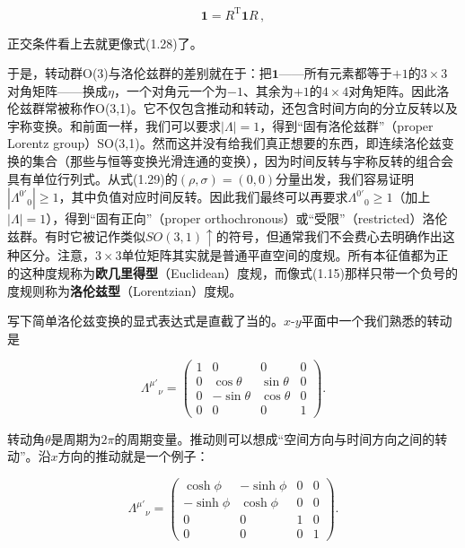 \begin{equation*}
\mathbf{1}=R^{\mathrm{T}}\mathbf{1}R\,,
\tag{1.30}
\end{equation*}

正交条件看上去就更像式(1.28)了。

于是，转动群O(3)与洛伦兹群的差别就在于：把$\mathbf{1}$——所有元素都等于$+1$的$3\times3$对角矩阵——换成$\eta$，一个对角元一个为$-1$、其余为$+1$的$4\times4$对角矩阵。因此洛伦兹群常被称作O(3,1)。它不仅包含推动和转动，还包含时间方向的分立反转以及宇称变换。和前面一样，我们可以要求$|\Lambda|=1$，得到“固有洛伦兹群”（proper Lorentz group）SO(3,1)。然而这并没有给我们真正想要的东西，即连续洛伦兹变换的集合（那些与恒等变换光滑连通的变换），因为时间反转与宇称反转的组合会具有单位行列式。从式(1.29)的$(\rho,\sigma)=(0,0)$分量出发，我们容易证明$|\Lambda^{0'}{}_{0}|\geq1$，其中负值对应时间反转。因此我们最终可以再要求$\Lambda^{0'}{}_{0}\geq1$（加上$|\Lambda|=1$），得到“固有正向”（proper orthochronous）或“受限”（restricted）洛伦兹群。有时它被记作类似$SO(3,1)\uparrow$的符号，但通常我们不会费心去明确作出这种区分。注意，$3\times3$单位矩阵其实就是普通平直空间的度规。所有本征值都为正的这种度规称为\textbf{欧几里得型}（Euclidean）度规，而像式(1.15)那样只带一个负号的度规则称为\textbf{洛伦兹型}（Lorentzian）度规。

写下简单洛伦兹变换的显式表达式是直截了当的。$x$-$y$平面中一个我们熟悉的转动是

\begin{equation*}
\Lambda^{\mu'}{}_{\nu}=
\begin{pmatrix}
1 & 0 & 0 & 0\\
0 & \cos\theta & \sin\theta & 0\\
0 & -\sin\theta & \cos\theta & 0\\
0 & 0 & 0 & 1
\end{pmatrix}.
\tag{1.31}
\end{equation*}

转动角$\theta$是周期为$2\pi$的周期变量。推动则可以想成“空间方向与时间方向之间的转动”。沿$x$方向的推动就是一个例子：

\begin{equation*}
\Lambda^{\mu'}{}_{\nu}=
\begin{pmatrix}
\cosh\phi & -\sinh\phi & 0 & 0\\
-\sinh\phi & \cosh\phi & 0 & 0\\
0 & 0 & 1 & 0\\
0 & 0 & 0 & 1
\end{pmatrix}.
\tag{1.32}
\end{equation*}

